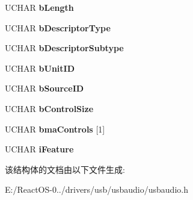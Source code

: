 \begin{DoxyCompactItemize}
\item 
\mbox{\label{struct_u_s_b___a_u_d_i_o___c_o_n_t_r_o_l___f_e_a_t_u_r_e___u_n_i_t___d_e_s_c_r_i_p_t_o_r_a738c5a8c7acb3ff30bd5e3b5309fc6fc}} 
U\+C\+H\+AR {\bfseries b\+Length}
\item 
\mbox{\label{struct_u_s_b___a_u_d_i_o___c_o_n_t_r_o_l___f_e_a_t_u_r_e___u_n_i_t___d_e_s_c_r_i_p_t_o_r_ae3ecd8b8dec9567b2d64f9d4032eaf73}} 
U\+C\+H\+AR {\bfseries b\+Descriptor\+Type}
\item 
\mbox{\label{struct_u_s_b___a_u_d_i_o___c_o_n_t_r_o_l___f_e_a_t_u_r_e___u_n_i_t___d_e_s_c_r_i_p_t_o_r_a12e06873c6dfcbf397099016b8444132}} 
U\+C\+H\+AR {\bfseries b\+Descriptor\+Subtype}
\item 
\mbox{\label{struct_u_s_b___a_u_d_i_o___c_o_n_t_r_o_l___f_e_a_t_u_r_e___u_n_i_t___d_e_s_c_r_i_p_t_o_r_ad3ab8e82d1b7f5061d02104abc6af94b}} 
U\+C\+H\+AR {\bfseries b\+Unit\+ID}
\item 
\mbox{\label{struct_u_s_b___a_u_d_i_o___c_o_n_t_r_o_l___f_e_a_t_u_r_e___u_n_i_t___d_e_s_c_r_i_p_t_o_r_a0e1dff005f2348e8513ff2bf7906dce5}} 
U\+C\+H\+AR {\bfseries b\+Source\+ID}
\item 
\mbox{\label{struct_u_s_b___a_u_d_i_o___c_o_n_t_r_o_l___f_e_a_t_u_r_e___u_n_i_t___d_e_s_c_r_i_p_t_o_r_a637fd2f4df2b69e7cfdf10b87194132e}} 
U\+C\+H\+AR {\bfseries b\+Control\+Size}
\item 
\mbox{\label{struct_u_s_b___a_u_d_i_o___c_o_n_t_r_o_l___f_e_a_t_u_r_e___u_n_i_t___d_e_s_c_r_i_p_t_o_r_af5243ffa1687d8d209cfc4b0979340ac}} 
U\+C\+H\+AR {\bfseries bma\+Controls} \mbox{[}1\mbox{]}
\item 
\mbox{\label{struct_u_s_b___a_u_d_i_o___c_o_n_t_r_o_l___f_e_a_t_u_r_e___u_n_i_t___d_e_s_c_r_i_p_t_o_r_a0b807b17a66ca9feb6f5617ecc386649}} 
U\+C\+H\+AR {\bfseries i\+Feature}
\end{DoxyCompactItemize}


该结构体的文档由以下文件生成\+:\begin{DoxyCompactItemize}
\item 
E\+:/\+React\+O\+S-\/0../drivers/usb/usbaudio/usbaudio.\+h\end{DoxyCompactItemize}
